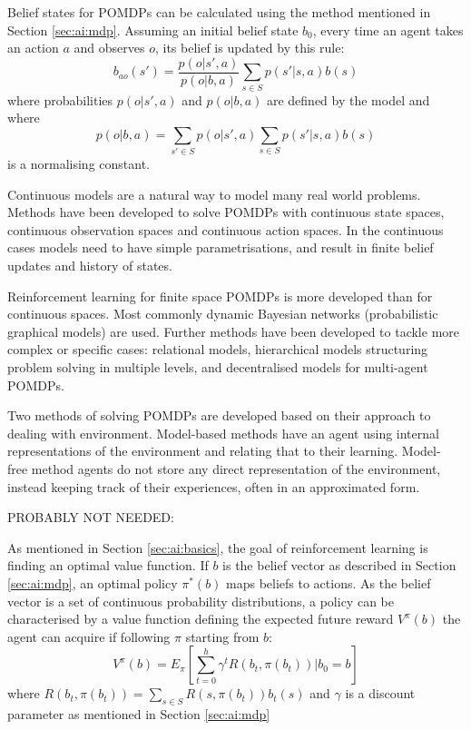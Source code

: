 Belief states for POMDPs can be calculated using the method mentioned in
Section \ref{sec:ai:mdp}. Assuming an initial belief state \(b_0\), every time
an agent takes an action \(a\) and observes \(o\), its belief is updated by
this rule: \[ b_{ao}(s') = \frac{ p(o|s',a) }{ p(o|b,a) } \sum_{s \in S}
p(s'|s,a) b(s) \] where probabilities \(p(o|s',a)\) and \(p(o|b,a)\) are
defined by the model and where \[p(o|b,a) = \sum_{s' \in S} p(o|s',a) \sum_{s
\in S} p(s'|s,a) b(s) \] is a normalising constant.
\parencite{Spaan2012ai+pomdp}

Continuous models are a natural way to model many real world problems. Methods
have been developed to solve POMDPs with continuous state spaces, continuous
observation spaces and continuous action spaces. In the continuous cases models
need to have simple parametrisations, and result in finite belief updates and
history of states. \parencite{Spaan2012ai+pomdp}

Reinforcement learning for finite space POMDPs is more developed than for
continuous spaces. Most commonly dynamic Bayesian networks (probabilistic
graphical models) are used. Further methods have been developed to tackle more
complex or specific cases: relational models, hierarchical models structuring
problem solving in multiple levels, and decentralised models for multi-agent
POMDPs. \parencite{Spaan2012ai+pomdp}

Two methods of solving POMDPs are developed based on their approach to dealing
with environment. Model-based methods have an agent using internal
representations of the environment and relating that to their learning. Model-
free method agents do not store any direct representation of the environment,
instead keeping track of their experiences, often in an approximated form.

PROBABLY NOT NEEDED:

As mentioned in Section \ref{sec:ai:basics}, the goal of reinforcement learning
is finding an optimal value function. If \(b\) is the belief vector as
described in Section \ref{sec:ai:mdp}, an optimal policy \(\pi^*(b)\) maps
beliefs to actions. As the belief vector is a set of continuous probability
distributions, a policy can be characterised by a value function defining the
expected future reward \(V^{\pi}(b)\) the agent can acquire if following
\(\pi\) starting from \(b\):
\[ V^{\pi}(b) = 
E_{\pi} \left [ \sum_{t=0}^h \gamma^t R(b_t, \pi(b_t)) | b_0 = b \right ] \]
where \( R(b_t, \pi (b_t)) = \sum_{s \in S} R(s, \pi (b_t)) b_t(s) \) and 
\(\gamma\) is a discount parameter as mentioned in Section \ref{sec:ai:mdp}



